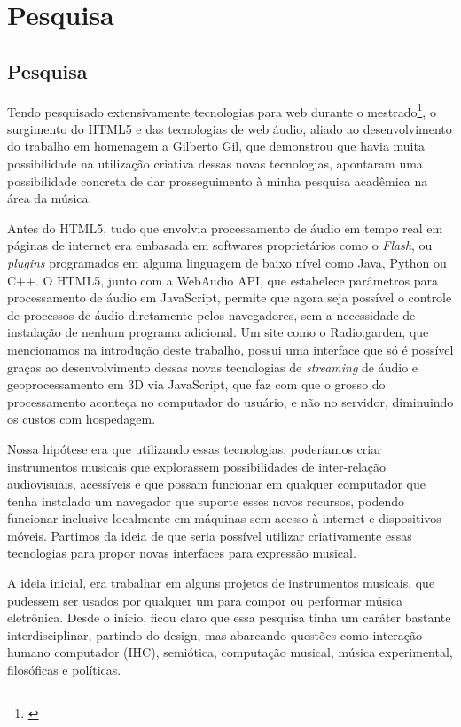 \chapter{Pesquisa}
\label{ch:pesquisa}

\section{Pesquisa}

    Tendo pesquisado extensivamente tecnologias para web durante o mestrado\footnote{\cite{Stolfi}}, o surgimento do HTML5 e das tecnologias de web áudio, aliado ao desenvolvimento do trabalho em homenagem a Gilberto Gil, que demonstrou que havia muita possibilidade na utilização criativa dessas novas tecnologias, apontaram uma possibilidade concreta de dar prosseguimento à minha pesquisa acadêmica na área da música.

Antes do HTML5, tudo que envolvia processamento de áudio em tempo real em páginas de internet era embasada em softwares proprietários como o \emph{Flash}, ou \emph{plugins} programados em alguma linguagem de baixo nível como Java, Python ou C++. O HTML5, junto com a WebAudio API, que estabelece parâmetros para processamento de áudio em JavaScript, permite que agora seja possível o controle de processos de áudio diretamente pelos navegadores, sem a necessidade de instalação de nenhum programa adicional. Um site como o Radio.garden, que mencionamos na introdução deste trabalho, possui uma interface que só é possível graças ao desenvolvimento dessas novas tecnologias de \emph{streaming} de áudio e geoprocessamento em 3D via JavaScript, que faz com que o grosso do processamento aconteça no computador do usuário, e não no servidor, diminuindo os custos com hospedagem.

Nossa hipótese era que utilizando essas tecnologias, poderíamos criar instrumentos musicais que explorassem possibilidades de inter-relação audiovisuais, acessíveis e que possam funcionar em qualquer computador que tenha instalado um navegador que suporte esses novos recursos, podendo funcionar inclusive localmente em máquinas sem acesso à internet e dispositivos móveis. Partimos da ideia de que seria possível utilizar criativamente essas tecnologias para propor novas interfaces para expressão musical.
    
A ideia inicial, era trabalhar em alguns projetos de instrumentos musicais, que pudessem ser usados por qualquer um para compor ou performar música eletrônica. Desde o início, ficou claro que essa pesquisa tinha um caráter bastante interdisciplinar, partindo do design, mas abarcando questões como interação humano computador (IHC), semiótica, computação musical, música experimental, filosóficas e políticas.

